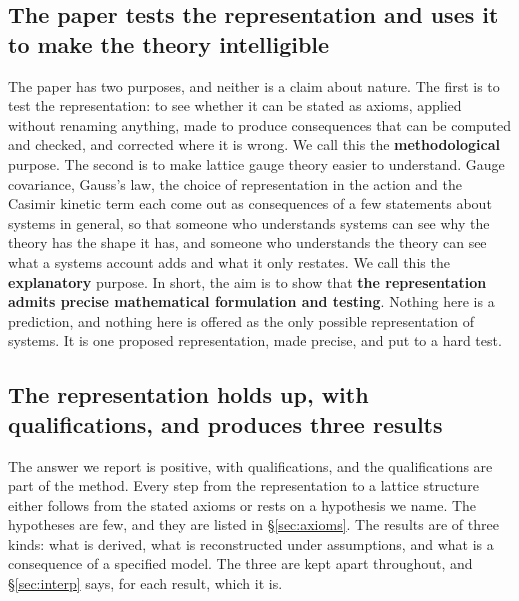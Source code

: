 \documentclass[11pt,a4paper]{article}
\theoremstyle{plain}
\theoremstyle{definition}
\theoremstyle{remark}
\begin{document}
\subsection{The paper tests the representation and uses it to make the theory intelligible}

The paper has two purposes, and neither is a claim about nature. The first is to test the representation: to see whether it can be stated as axioms, applied without renaming anything, made to produce consequences that can be computed and checked, and corrected where it is wrong. We call this the \textbf{methodological} purpose. The second is to make lattice gauge theory easier to understand. Gauge covariance, Gauss's law, the choice of representation in the action and the Casimir kinetic term each come out as consequences of a few statements about systems in general, so that someone who understands systems can see why the theory has the shape it has, and someone who understands the theory can see what a systems account adds and what it only restates. We call this the \textbf{explanatory} purpose. In short, the aim is to show that \textbf{the representation admits precise mathematical formulation and testing}. Nothing here is a prediction, and nothing here is offered as the only possible representation of systems. It is one proposed representation, made precise, and put to a hard test.

\subsection{The representation holds up, with qualifications, and produces three results}

The answer we report is positive, with qualifications, and the qualifications are part of the method. Every step from the representation to a lattice structure either follows from the stated axioms or rests on a hypothesis we name. The hypotheses are few, and they are listed in \S\ref{sec:axioms}. The results are of three kinds: what is derived, what is reconstructed under assumptions, and what is a consequence of a specified model. The three are kept apart throughout, and \S\ref{sec:interp} says, for each result, which it is.
\end{document}
